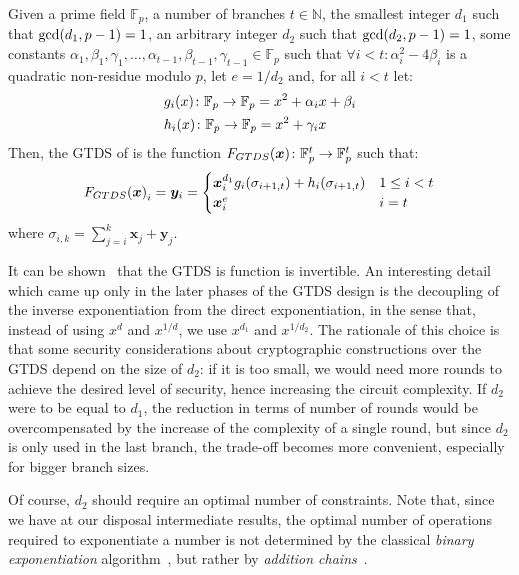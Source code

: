 \begin{definition}\label{def:gtds}
  Given a prime field \(\mathbb{F}_p\), a number of branches \(t \in \mathbb{N}\), the smallest 
  integer \(d_1\) such that \(\call{\gcd}{d_1, p - 1} = 1\), an arbitrary 
  integer \(d_2\) such that \(\call{\gcd}{d_2, p - 1} = 1\), some constants 
  \(\alpha_{1}, \beta_{1}, \gamma_1, \dots, \alpha_{t - 1}, \beta_{t - 1}, \gamma_{t - 1} \in \mathbb{F}_p\) 
  such that \(\forall i < t\colon \alpha_i^2 - 4\beta_i\) is a quadratic non-residue modulo 
  \(p\), let \(e = {1}/{d_2}\) and, for all \(i < t\) let:
  \begin{align*}
    & \call{g_i}{x}\colon \mathbb{F}_p \to \mathbb{F}_p = x^2 + \alpha_{i}x + \beta_{i} \\
    & \call{h_i}{x}\colon \mathbb{F}_p \to \mathbb{F}_p = x^2 + \gamma_{i}x
  \end{align*}
  Then, the GTDS of \Arion{} is the function 
  \(\call{F_{GTDS}}{\bm{x}}\colon \mathbb{F}_p^t \to \mathbb{F}_p^t\) such that:
  \[
    \call{F_{GTDS}}{\bm{x}}_i = \bm{y}_i = 
    \begin{cases}
      \bm{x}_i^{d_1}\call{g_i}{\sigma_{i+1, t}} + \call{h_i}{\sigma_{i+1, t}} & 1 \le i < t \\
      \bm{x}_i^e & i = t
    \end{cases}
  \]
  where \(\sigma_{i, k} = \sum_{j=i}^{k}{\bm{x}_j + \bm{y}_j}\).
\end{definition}

It can be shown~\cite{RoyS2022} that the GTDS is function is invertible.
An interesting detail which came up only in the later phases of the GTDS design is the decoupling 
of the inverse exponentiation from the direct exponentiation, in the sense that, instead of 
using \(x^d\) and \(x^{1/d}\), we use \(x^{d_1}\) and \(x^{1/d_2}\).
The rationale of this choice is that some security considerations about cryptographic constructions
over the GTDS depend on the size of \(d_2\): if it is too small, we would need more rounds to 
achieve the desired level of security, hence increasing the circuit complexity.
If \(d_2\) were to be equal to \(d_1\), the reduction in terms of number of rounds would be 
overcompensated by the increase of the complexity of a single round, but since \(d_2\) is only 
used in the last branch, the trade-off becomes more convenient, especially for bigger branch sizes.

Of course, \(d_2\) should require an optimal number of constraints.
Note that, since we have at our disposal intermediate results, the optimal number of operations 
required to exponentiate a number is not determined by the classical \emph{binary exponentiation} 
algorithm~\cite{Gueron2011}, but rather by \emph{addition chains}~\cite{BosC1990}.

